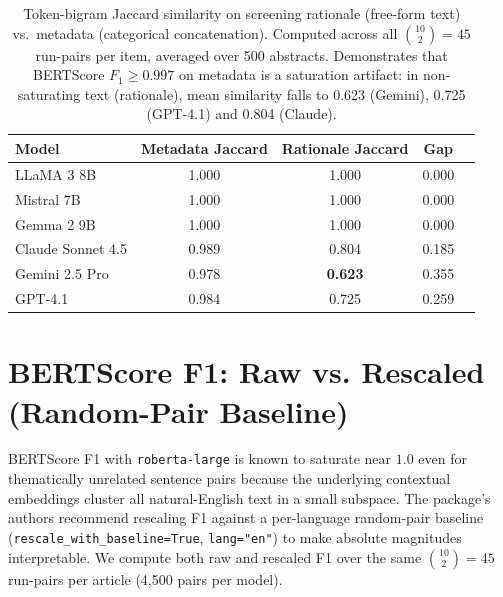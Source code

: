 \documentclass[11pt]{article}
\newenvironment{fittab}{\begin{lrbox}{\fittabbox}}{\end{lrbox}%
  \ifdim\wd\fittabbox>\linewidth\resizebox{\linewidth}{!}{\usebox{\fittabbox}}\else\usebox{\fittabbox}\fi}
\begin{document}
\begin{table}[htbp]
\centering
\caption{Token-bigram Jaccard similarity on screening rationale (free-form text) vs.\ metadata (categorical concatenation). Computed across all $\binom{10}{2}{=}45$ run-pairs per item, averaged over 500 abstracts. Demonstrates that BERTScore $F_1{\geq}0.997$ on metadata is a saturation artifact: in non-saturating text (rationale), mean similarity falls to 0.623 (Gemini), 0.725 (GPT-4.1) and 0.804 (Claude).}
\label{tab:rationale}
\begin{fittab}\begin{tabular}{lcccc}
\toprule
\textbf{Model} & \textbf{Metadata Jaccard} & \textbf{Rationale Jaccard} & \textbf{Gap} \\
\midrule
LLaMA 3 8B    & 1.000 & 1.000 & 0.000 \\
Mistral 7B    & 1.000 & 1.000 & 0.000 \\
Gemma 2 9B    & 1.000 & 1.000 & 0.000 \\
\midrule
Claude Sonnet 4.5 & 0.989 & 0.804 & 0.185 \\
Gemini 2.5 Pro    & 0.978 & \textbf{0.623} & 0.355 \\
GPT-4.1           & 0.984 & 0.725 & 0.259 \\
\bottomrule
\end{tabular}\end{fittab}
\end{table}

\section{BERTScore F1: Raw vs. Rescaled (Random-Pair Baseline)}
\label{sec:bertscore_rescaled_supp}

BERTScore F1 with \texttt{roberta-large} is known to saturate near $1.0$ even for thematically unrelated sentence pairs because the underlying contextual embeddings cluster all natural-English text in a small subspace. The package's authors recommend rescaling F1 against a per-language random-pair baseline (\texttt{rescale\_with\_baseline=True}, \texttt{lang="en"}) to make absolute magnitudes interpretable. We compute both raw and rescaled F1 over the same $\binom{10}{2}{=}45$ run-pairs per article (4,500 pairs per model).
\end{document}
